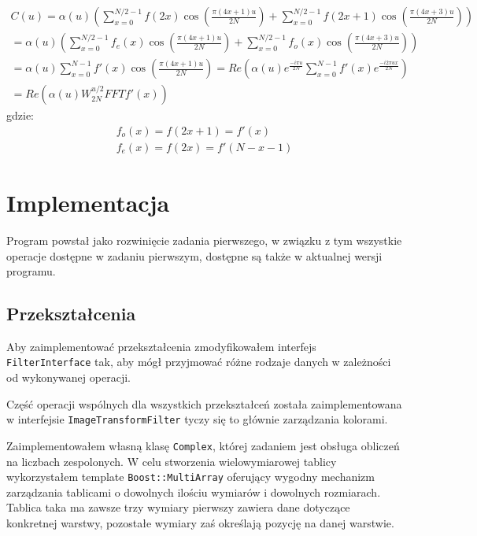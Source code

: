 \documentclass{classrep}
\begin{document}
\begin{equation}
  \label{eq.fct}
  \begin{array}{l}
    C(u) = \alpha(u) \left( \displaystyle \sum_{x = 0}^{N/2 - 1} f(2x) \cos \left(\frac{\pi(4x + 1)u}{2N}\right) + \displaystyle \sum_{x = 0}^{N/2 - 1} f(2x + 1) \cos \left(\frac{\pi(4x + 3)u}{2N}\right)\right) \\
    = \alpha(u) \left( \displaystyle \sum_{x = 0}^{N/2 - 1} f_e(x) \cos \left(\frac{\pi(4x + 1)u}{2N}\right) + \displaystyle \sum_{x = 0}^{N/2 - 1} f_o(x) \cos \left(\frac{\pi(4x + 3)u}{2N}\right) \right) \\
    = \alpha(u) \displaystyle \sum_{x = 0}^{N - 1} f'(x) \cos \left(\frac{\pi(4x + 1)u}{2N}\right) = Re \left(\alpha(u) e^{\frac{-i\pi u}{2N}} \displaystyle \sum_{x = 0}^{N - 1} f'(x) e^{\frac{-i2\pi ux}{2N}}\right) \\
    = Re \left(\alpha(u) W_{2N}^{u/2} FFT{f'}(x)\right)
  \end{array}
\end{equation}
gdzie:
\begin{eqnarray}
  f_o(x) = f(2x+1) = f'(x)\\
  f_e(x) = f(2x)   = f'(N - x - 1)
\end{eqnarray}

\clearpage

\section{Implementacja}
Program powstał jako rozwinięcie zadania pierwszego, w związku z tym wszystkie operacje dostępne w zadaniu pierwszym, dostępne są także w aktualnej wersji programu.

\subsection{Przekształcenia}
Aby zaimplementować przekształcenia zmodyfikowałem interfejs \verb|FilterInterface| tak, aby mógł przyjmować różne rodzaje danych \ppauza w zależności od wykonywanej operacji.

Część operacji wspólnych dla wszystkich przekształceń została zaimplementowana w interfejsie \verb|ImageTransformFilter| \ppauza tyczy się to głównie zarządzania kolorami.

Zaimplementowałem własną klasę \verb|Complex|, której zadaniem jest obsługa obliczeń na liczbach zespolonych. W celu stworzenia wielowymiarowej tablicy wykorzystałem template \verb|Boost::MultiArray| oferujący wygodny mechanizm zarządzania tablicami o dowolnych ilościu wymiarów i dowolnych rozmiarach. Tablica taka ma zawsze trzy wymiary \ppauza pierwszy zawiera dane dotyczące konkretnej warstwy, pozostałe wymiary zaś określają pozycję na danej warstwie.
\end{document}
